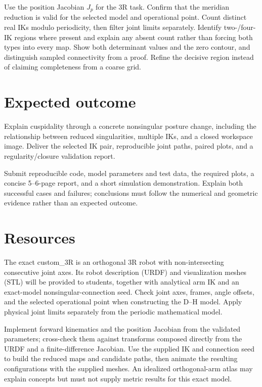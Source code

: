 \documentclass[11pt,a4paper]{article}
\begin{document}
Use the position Jacobian $J_p$ for the 3R task.
Confirm that the meridian reduction is valid for the selected model and
operational point. Count distinct real IKs modulo periodicity, then filter
joint limits separately. Identify two-/four-IK regions where present and
explain any absent count rather than forcing both types into every map. Show both determinant values and the zero contour,
and distinguish sampled connectivity from a proof. Refine the decisive
region instead of claiming completeness from a coarse grid.

\section*{Expected outcome}
Explain cuspidality through a concrete nonsingular posture change, including
the relationship between reduced singularities, multiple IKs, and a closed
workspace image. Deliver the selected IK pair, reproducible joint paths,
paired plots, and a regularity/closure validation report.

Submit reproducible code, model parameters and test data, the required plots,
a concise 5--6-page report, and a short simulation demonstration. Explain
both successful cases and failures; conclusions must follow the numerical
and geometric evidence rather than an expected outcome.

\section*{Resources}
The exact custom\_3R is an orthogonal 3R robot with non-intersecting
consecutive joint axes. Its robot description (URDF) and visualization meshes
(STL) will be provided to students, together with analytical arm IK and an
exact-model nonsingular-connection seed. Check joint axes, frames, angle
offsets, and the selected operational point when constructing the D--H model.
Apply physical joint limits separately from the periodic mathematical model.

Implement forward kinematics and the position Jacobian from the validated
parameters; cross-check them against transforms composed directly from the
URDF and a finite-difference Jacobian. Use the supplied IK and connection
seed to build the reduced maps and candidate paths, then animate the resulting
configurations with the supplied meshes. An idealized orthogonal-arm atlas may
explain concepts but must not supply metric results for this exact model.
\end{document}
